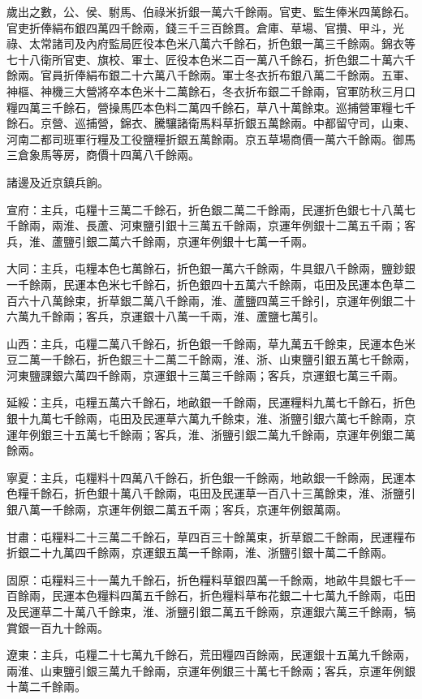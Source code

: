 歲出之數，公、侯、駙馬、伯祿米折銀一萬六千餘兩。官吏、監生俸米四萬餘石。官吏折俸絹布銀四萬四千餘兩，錢三千三百餘貫。倉庫、草場、官攢、甲斗，光祿、太常諸司及內府監局匠役本色米八萬六千餘石，折色銀一萬三千餘兩。錦衣等七十八衛所官吏、旗校、軍士、匠役本色米二百一萬八千餘石，折色銀二十萬六千餘兩。官員折俸絹布銀二十六萬八千餘兩。軍士冬衣折布銀八萬二千餘兩。五軍、神樞、神機三大營將卒本色米十二萬餘石，冬衣折布銀二千餘兩，官軍防秋三月口糧四萬三千餘石，營操馬匹本色料二萬四千餘石，草八十萬餘束。巡捕營軍糧七千餘石。京營、巡捕營，錦衣、騰驤諸衛馬料草折銀五萬餘兩。中都留守司，山東、河南二都司班軍行糧及工役鹽糧折銀五萬餘兩。京五草場商價一萬六千餘兩。御馬三倉象馬等房，商價十四萬八千餘兩。

諸邊及近京鎮兵餉。

宣府：主兵，屯糧十三萬二千餘石，折色銀二萬二千餘兩，民運折色銀七十八萬七千餘兩，兩淮、長蘆、河東鹽引銀十三萬五千餘兩，京運年例銀十二萬五千兩；客兵，淮、蘆鹽引銀二萬六千餘兩，京運年例銀十七萬一千兩。

大同：主兵，屯糧本色七萬餘石，折色銀一萬六千餘兩，牛具銀八千餘兩，鹽鈔銀一千餘兩，民運本色米七千餘石，折色銀四十五萬六千餘兩，屯田及民運本色草二百六十八萬餘束，折草銀二萬八千餘兩，淮、蘆鹽四萬三千餘引，京運年例銀二十六萬九千餘兩；客兵，京運銀十八萬一千兩，淮、蘆鹽七萬引。

山西：主兵，屯糧二萬八千餘石，折色銀一千餘兩，草九萬五千餘束，民運本色米豆二萬一千餘石，折色銀三十二萬二千餘兩，淮、浙、山東鹽引銀五萬七千餘兩，河東鹽課銀六萬四千餘兩，京運銀十三萬三千餘兩；客兵，京運銀七萬三千兩。

延綏：主兵，屯糧五萬六千餘石，地畝銀一千餘兩，民運糧料九萬七千餘石，折色銀十九萬七千餘兩，屯田及民運草六萬九千餘束，淮、浙鹽引銀六萬七千餘兩，京運年例銀三十五萬七千餘兩；客兵，淮、浙鹽引銀二萬九千餘兩，京運年例銀二萬餘兩。

寧夏：主兵，屯糧料十四萬八千餘石，折色銀一千餘兩，地畝銀一千餘兩，民運本色糧千餘石，折色銀十萬八千餘兩，屯田及民運草一百八十三萬餘束，淮、浙鹽引銀八萬一千餘兩，京運年例銀二萬五千兩；客兵，京運年例銀萬兩。

甘肅：屯糧料二十三萬二千餘石，草四百三十餘萬束，折草銀二千餘兩，民運糧布折銀二十九萬四千餘兩，京運銀五萬一千餘兩，淮、浙鹽引銀十萬二千餘兩。

固原：屯糧料三十一萬九千餘石，折色糧料草銀四萬一千餘兩，地畝牛具銀七千一百餘兩，民運本色糧料四萬五千餘石，折色糧料草布花銀二十七萬九千餘兩，屯田及民運草二十萬八千餘束，淮、浙鹽引銀二萬五千餘兩，京運銀六萬三千餘兩，犒賞銀一百九十餘兩。

遼東：主兵，屯糧二十七萬九千餘石，荒田糧四百餘兩，民運銀十五萬九千餘兩，兩淮、山東鹽引銀三萬九千餘兩，京運年例銀三十萬七千餘兩；客兵，京運年例銀十萬二千餘兩。

